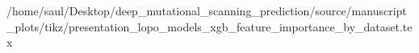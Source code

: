 /home/saul/Desktop/deep_mutational_scanning_prediction/source/manuscript_plots/tikz/presentation_lopo_models_xgb_feature_importance_by_dataset.tex
